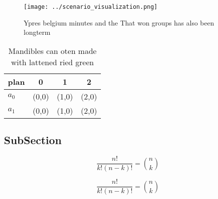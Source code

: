 \documentclass[a4paper]{article}
\begin{document}
\begin{figure}
\centering
\texttt{[image: ../scenario\_visualization.png]}
\caption{Ypres belgium minutes and the That won groups has also been longterm 
}
\end{figure}
 
\begin{table}
\begin{adjustbox}{width=0.6\columnwidth}
\begin{tabular}{|l|l|l|l|}
\hline
\textbf{plan} & \multicolumn{1}{c|}{\textbf{0}} & \multicolumn{1}{c|}{\textbf{1}} & \multicolumn{1}{c|}{\textbf{2}} \\ \hline
\textbf{$a_0$}  & (0,0) & (1,0) & (2,0) \\ \hline
\textbf{$a_1$}  & (0,0) & (1,0) & (2,0) \\ \hline
\end{tabular}
\end{adjustbox}
\caption{Mandibles can oten made with lattened ried green 
}
\end{table}

\subsection{SubSection}

\[ \frac{n!}{k!(n-k)!} = \binom{n}{k} \]

\[ \frac{n!}{k!(n-k)!} = \binom{n}{k} \]
\end{document}
